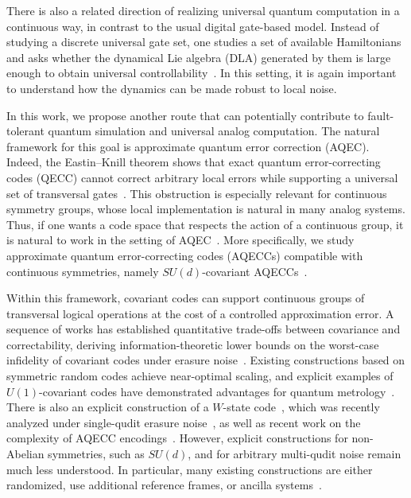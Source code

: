\documentclass[10pt,twocolumn,superscriptaddress,aps,amsmath,amssymb,citeautoscript,floatfix,prx,longbibliography]{revtex4-2}
\newcounter{alg}
\theoremstyle{plain}
\theoremstyle{plain}
\theoremstyle{plain}
\theoremstyle{plain}
\theoremstyle{plain}
\theoremstyle{plain}
\begin{document}
There is also a related direction of realizing universal quantum computation in a continuous way, in contrast to the usual digital gate-based model. Instead of studying a discrete universal gate set, one studies a set of available Hamiltonians and asks whether the dynamical Lie algebra (DLA) generated by them is large enough to obtain universal controllability~\cite{Tavis1968,DAlessandro2021,Chen2020,Albertini2018,Albertini2020,Wang2016,Wang2012,Zanardi2004,AlbertiniDAlessandro2025,Hu2025}. In this setting, it is again important to understand how the dynamics can be made robust to local noise.

In this work, we propose another route that can potentially contribute to fault-tolerant quantum simulation and universal analog computation. The natural framework for this goal is approximate quantum error correction (AQEC). Indeed, the Eastin--Knill theorem shows that exact quantum error-correcting codes (QECC) cannot correct arbitrary local errors while supporting a universal set of transversal gates~\cite{Eastin2009}. This obstruction is especially relevant for continuous symmetry groups, whose local implementation is natural in many analog systems. Thus, if one wants a code space that respects the action of a continuous group, it is natural to work in the setting of AQEC~\cite{Beny2010}. More specifically, we study approximate quantum error-correcting codes (AQECCs) compatible with continuous symmetries, namely \(SU(d)\)-covariant AQECCs~\cite{Hayden2021}.

Within this framework, covariant codes can support continuous groups of transversal logical operations at the cost of a controlled approximation error. A sequence of works has established quantitative trade-offs between covariance and correctability, deriving information-theoretic lower bounds on the worst-case infidelity of covariant codes under erasure noise~\cite{Faist2020,Zhou2021,Faist2023,Kong2022,Yang2022}. Existing constructions based on symmetric random codes achieve near-optimal scaling, and explicit examples of \(U(1)\)-covariant codes have demonstrated advantages for quantum metrology~\cite{Lin2025}. There is also an explicit construction of a \(W\)-state code~\cite{Faist2020}, which was recently analyzed under single-qudit erasure noise~\cite{Alexander2025}, as well as recent work on the complexity of AQECC encodings~\cite{Yi2024}. However, explicit constructions for non-Abelian symmetries, such as \(SU(d)\), and for arbitrary multi-qudit noise remain much less understood. In particular, many existing constructions are either randomized, use additional reference frames, or ancilla systems~\cite{Kong2022,Yang2022}.
\end{document}
